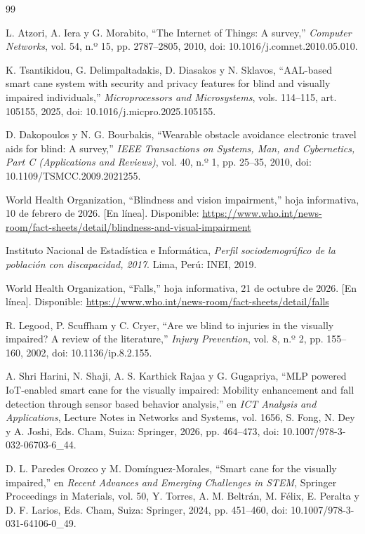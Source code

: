 \documentclass[conference,a4paper]{IEEEtran}
\begin{document}
\begin{thebibliography}{99}

L. Atzori, A. Iera y G. Morabito, ``The Internet of Things: A survey,'' \emph{Computer Networks}, vol. 54, n.º 15, pp. 2787--2805, 2010, doi: 10.1016/j.comnet.2010.05.010.

K. Tsantikidou, G. Delimpaltadakis, D. Diasakos y N. Sklavos, ``AAL-based smart cane system with security and privacy features for blind and visually impaired individuals,'' \emph{Microprocessors and Microsystems}, vols. 114--115, art. 105155, 2025, doi: 10.1016/j.micpro.2025.105155.

D. Dakopoulos y N. G. Bourbakis, ``Wearable obstacle avoidance electronic travel aids for blind: A survey,'' \emph{IEEE Transactions on Systems, Man, and Cybernetics, Part C (Applications and Reviews)}, vol. 40, n.º 1, pp. 25--35, 2010, doi: 10.1109/TSMCC.2009.2021255.

World Health Organization, ``Blindness and vision impairment,'' hoja informativa, 10 de febrero de 2026. [En línea]. Disponible: \url{https://www.who.int/news-room/fact-sheets/detail/blindness-and-visual-impairment}

Instituto Nacional de Estadística e Informática, \emph{Perfil sociodemográfico de la población con discapacidad, 2017}. Lima, Perú: INEI, 2019.

World Health Organization, ``Falls,'' hoja informativa, 21 de octubre de 2026. [En línea]. Disponible: \url{https://www.who.int/news-room/fact-sheets/detail/falls}

R. Legood, P. Scuffham y C. Cryer, ``Are we blind to injuries in the visually impaired? A review of the literature,'' \emph{Injury Prevention}, vol. 8, n.º 2, pp. 155--160, 2002, doi: 10.1136/ip.8.2.155.

A. Shri Harini, N. Shaji, A. S. Karthick Rajaa y G. Gugapriya, ``MLP powered IoT-enabled smart cane for the visually impaired: Mobility enhancement and fall detection through sensor based behavior analysis,'' en \emph{ICT Analysis and Applications}, Lecture Notes in Networks and Systems, vol. 1656, S. Fong, N. Dey y A. Joshi, Eds. Cham, Suiza: Springer, 2026, pp. 464--473, doi: 10.1007/978-3-032-06703-6\_44.

D. L. Paredes Orozco y M. Domínguez-Morales, ``Smart cane for the visually impaired,'' en \emph{Recent Advances and Emerging Challenges in STEM}, Springer Proceedings in Materials, vol. 50, Y. Torres, A. M. Beltrán, M. Félix, E. Peralta y D. F. Larios, Eds. Cham, Suiza: Springer, 2024, pp. 451--460, doi: 10.1007/978-3-031-64106-0\_49.


\end{thebibliography}
\end{document}
